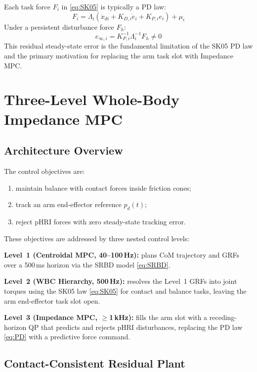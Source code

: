 \documentclass[journal]{IEEEtran}
\begin{document}
Each task force $F_i$ in \eqref{eq:SK05} is typically a PD law:
\begin{equation}\label{eq:PD}
  F_i = \Lambda_i(\ddot{x}_{di}+K_{D,i}\dot{e}_i+K_{P,i}e_i)+\mu_i
\end{equation}
Under a persistent disturbance force $F_h$:
\begin{equation}\label{eq:sse}
  e_{\infty,i} = K_{P,i}^{-1}\Lambda_i^{-1}F_h \neq 0
\end{equation}
This residual steady-state error is the fundamental limitation of the SK05
PD law and the primary motivation for replacing the arm task slot with
Impedance MPC.

\section{Three-Level Whole-Body Impedance MPC}\label{sec:impedancempc}

\subsection{Architecture Overview}

The control objectives are:
\begin{enumerate}
  \item maintain balance with contact forces inside friction cones;
  \item track an arm end-effector reference $p_d(t)$;
  \item reject pHRI forces with zero steady-state tracking error.
\end{enumerate}

These objectives are addressed by three nested control levels:

\textbf{Level~1 (Centroidal MPC, 40--100\,Hz):} plans CoM trajectory and
GRFs over a 500\,ms horizon via the SRBD model \eqref{eq:SRBD}.

\textbf{Level~2 (WBC Hierarchy, 500\,Hz):} resolves the Level~1 GRFs into
joint torques using the SK05 law \eqref{eq:SK05} for contact and balance
tasks, leaving the arm end-effector task slot open.

\textbf{Level~3 (Impedance MPC, $\geq$1\,kHz):} fills the arm slot with a
receding-horizon QP that predicts and rejects pHRI disturbances, replacing
the PD law \eqref{eq:PD} with a predictive force command.

\subsection{Contact-Consistent Residual Plant}
\end{document}

